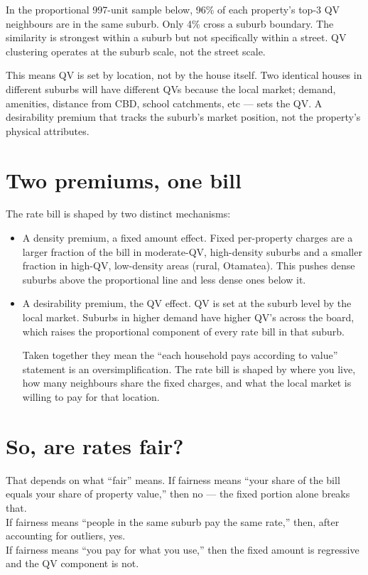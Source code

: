\documentclass[
  7pt,
  a4paper,
  DIV=11,
  numbers=noendperiod]{scrartcl}
\begin{document}
In the proportional 997-unit sample below, 96\% of each property's top-3
QV neighbours are in the same suburb. Only 4\% cross a suburb boundary.
The similarity is strongest within a suburb but not specifically within
a street. QV clustering operates at the suburb scale, not the street
scale.

This means QV is set by location, not by the house itself. Two identical
houses in different suburbs will have different QVs because the local
market; demand, amenities, distance from CBD, school catchments, etc ---
sets the QV. A desirability premium that tracks the suburb's market
position, not the property's physical attributes.

\section{Two premiums, one bill}\label{two-premiums-one-bill}

The rate bill is shaped by two distinct mechanisms:

\begin{itemize}
\item
  A density premium, a fixed amount effect. Fixed per-property charges
  are a larger fraction of the bill in moderate-QV, high-density suburbs
  and a smaller fraction in high-QV, low-density areas (rural,
  Otamatea). This pushes dense suburbs above the proportional line and
  less dense ones below it.
\item
  A desirability premium, the QV effect. QV is set at the suburb level
  by the local market. Suburbs in higher demand have higher QV's across
  the board, which raises the proportional component of every rate bill
  in that suburb.

  Taken together they mean the ``each household pays according to
  value'' statement is an oversimplification. The rate bill is shaped by
  where you live, how many neighbours share the fixed charges, and what
  the local market is willing to pay for that location.
\end{itemize}

\section{So, are rates fair?}\label{so-are-rates-fair}

That depends on what ``fair'' means. If fairness means ``your share of
the bill equals your share of property value,'' then no --- the fixed
portion alone breaks that.\\
If fairness means ``people in the same suburb pay the same rate,'' then,
after accounting for outliers, yes.\\
If fairness means ``you pay for what you use,'' then the fixed amount is
regressive and the QV component is not.
\end{document}
